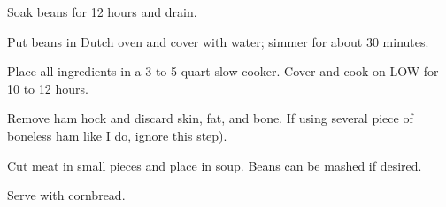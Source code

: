 Soak beans for 12 hours and drain.

Put beans in Dutch oven and cover with water; 
simmer for about 30 minutes. 

Place all ingredients in a 3 to 5-quart slow cooker. 
Cover and cook on LOW for 10 to 12 hours.

Remove ham hock and discard skin, fat, and bone. 
If using several piece of boneless ham like I do, ignore this step). 

Cut meat in small pieces and place in soup. 
Beans can be mashed if desired. 

Serve with cornbread.